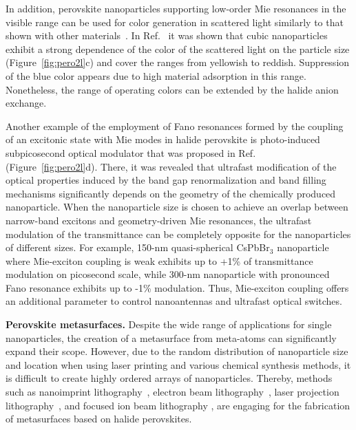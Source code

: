 \documentclass[journal=chreay,manuscript=review]{achemso}
\begin{document}
In addition, perovskite nanoparticles supporting low-order Mie resonances in the visible range can be used for color generation in scattered light similarly to that shown with other materials~\cite{kristensen2016plasmonic}. In Ref.~ it was shown that cubic nanoparticles exhibit a strong dependence of the color of the scattered light on the particle size (Figure~\ref{fig:pero2l}c) and cover the ranges from yellowish to reddish. Suppression of the blue color appears due to high material adsorption in this range. Nonetheless, the range of operating colors can be extended by the halide anion exchange.

Another example of the employment of Fano resonances formed by the coupling of an excitonic state with Mie modes in halide perovskite is photo-induced subpicosecond optical modulator that was proposed in Ref.~ (Figure~\ref{fig:pero2l}d). There, it was revealed that ultrafast modification of the optical properties induced by the band gap renormalization and band filling mechanisms significantly depends on the geometry of the chemically produced nanoparticle. When the nanoparticle size is chosen to achieve an overlap between narrow-band excitons and geometry-driven Mie resonances, the ultrafast modulation of the transmittance can be completely opposite for the nanoparticles of different sizes. For example, 150-nm quasi-spherical CsPbBr$_3$ nanoparticle where Mie-exciton coupling is weak exhibits up to +1\% of transmittance modulation on picosecond scale, while 300-nm nanoparticle with pronounced Fano resonance exhibits up to -1\% modulation. Thus, Mie-exciton coupling offers an additional parameter to control nanoantennas and ultrafast optical switches.


\textbf{Perovskite metasurfaces.}
Despite the wide range of applications for single nanoparticles, the creation of a metasurface from meta-atoms can significantly expand their scope. However, due to the random distribution of nanoparticle size and location when using laser printing and various chemical synthesis methods, it is difficult to create highly ordered arrays of nanoparticles. Thereby, methods such as nanoimprint lithography~\cite{makarov2017multifold, wang2016nanoimprinted}, electron beam lithography~\cite{fan2021enhanced, zhang2019lead}, laser projection lithography~\cite{zhizhchenko2020light, zhizhchenko2021direct}, and focused ion beam lithography \cite{baryshnikova2020broadband, gholipour2017organometallic}, are engaging for the fabrication of metasurfaces based on halide perovskites. 
\end{document}
